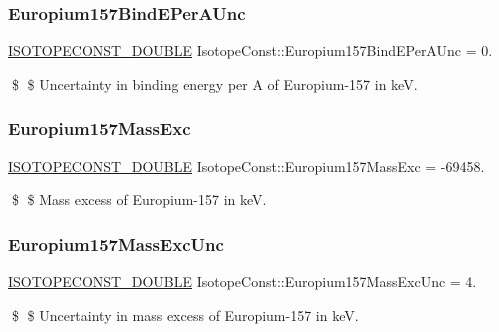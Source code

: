 \subsubsection{\texorpdfstring{Europium157\+Bind\+E\+Per\+A\+Unc}{Europium157BindEPerAUnc}}
{\footnotesize\ttfamily \mbox{\hyperlink{group___isotope_const-_macros_ga8f45a7272ce02c0b4c65c44636ed719a}{I\+S\+O\+T\+O\+P\+E\+C\+O\+N\+S\+T\+\_\+\+D\+O\+U\+B\+LE}} Isotope\+Const\+::\+Europium157\+Bind\+E\+Per\+A\+Unc = 0.}

\$ \$ Uncertainty in binding energy per A of Europium-\/157 in keV. \mbox{\label{group___isotope_const-_europium-_eu157_gacafa174db416a77de5edc228518eea6d}} 
\subsubsection{\texorpdfstring{Europium157\+Mass\+Exc}{Europium157MassExc}}
{\footnotesize\ttfamily \mbox{\hyperlink{group___isotope_const-_macros_ga8f45a7272ce02c0b4c65c44636ed719a}{I\+S\+O\+T\+O\+P\+E\+C\+O\+N\+S\+T\+\_\+\+D\+O\+U\+B\+LE}} Isotope\+Const\+::\+Europium157\+Mass\+Exc = -\/69458.}

\$ \$ Mass excess of Europium-\/157 in keV. \mbox{\label{group___isotope_const-_europium-_eu157_ga11fc37dc0ecc36bd04e46fb275dd86b6}} 
\subsubsection{\texorpdfstring{Europium157\+Mass\+Exc\+Unc}{Europium157MassExcUnc}}
{\footnotesize\ttfamily \mbox{\hyperlink{group___isotope_const-_macros_ga8f45a7272ce02c0b4c65c44636ed719a}{I\+S\+O\+T\+O\+P\+E\+C\+O\+N\+S\+T\+\_\+\+D\+O\+U\+B\+LE}} Isotope\+Const\+::\+Europium157\+Mass\+Exc\+Unc = 4.}

\$ \$ Uncertainty in mass excess of Europium-\/157 in keV. \mbox{\label{group___isotope_const-_europium-_eu157_ga47122ff0ad3e1d6c781d23c8f9ce5c6a}} 
